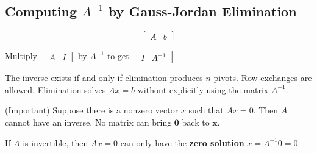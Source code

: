 \subsection{Computing $A^{-1}$ by Gauss-Jordan Elimination}

\begin{definition}
    \begin{equation} \left[\begin{matrix}
                A & b
            \end{matrix}\right]\end{equation}
\end{definition}

\begin{center}
    Multiply $ \left[\begin{matrix}
                A & I
            \end{matrix}\right]$ by $ A^{-1}$ to get $ \left[\begin{matrix}
                I & A^{-1}
            \end{matrix}\right]$
\end{center}

\begin{remark}
    The inverse exists if and only if elimination produces $n$ pivots. Row exchanges are allowed. Elimination solves $Ax = b$ without explicitly using the matrix $A^{-1}$.
\end{remark}

\begin{remark}
    (Important) Suppose there is a nonzero vector $ x $ such that $ A x=0 . $ Then $ A $ cannot have an inverse. No matrix can bring $ \mathbf{0} $ back to $ \boldsymbol{x} $.

If $ A $ is invertible, then $ A x=0 $ can only have the \textbf{zero solution} $ x=A^{-1} 0=0 $.
\end{remark}


